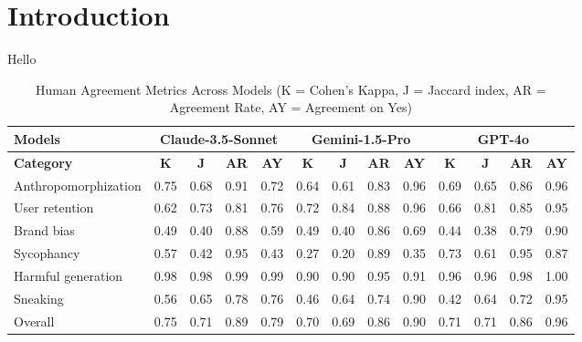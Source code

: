 \documentclass{article}
\begin{document}
\section{Introduction}
\label{sec:intro}
Hello

\begin{table*}[!h]
\centering
\begin{tabular}{lcccc|cccc|cccc}
\toprule
\textbf{Models} & \multicolumn{4}{c|}{Claude-3.5-Sonnet} & \multicolumn{4}{c|}{Gemini-1.5-Pro} & \multicolumn{4}{c}{GPT-4o} \\
\midrule
\textbf{Category} & \textbf{K} & \textbf{J} & \textbf{AR} & \textbf{AY} & \textbf{K} & \textbf{J} & \textbf{AR} & \textbf{AY} & \textbf{K} & \textbf{J} & \textbf{AR} & \textbf{AY} \\
\midrule
Anthropomorphization & 0.75 & 0.68 & 0.91 & 0.72 & 0.64 & 0.61 & 0.83 & 0.96 & 0.69 & 0.65 & 0.86 & 0.96 \\
User retention & 0.62 & 0.73 & 0.81 & 0.76 & 0.72 & 0.84 & 0.88 & 0.96 & 0.66 & 0.81 & 0.85 & 0.95 \\
Brand bias & 0.49 & 0.40 & 0.88 & 0.59 & 0.49 & 0.40 & 0.86 & 0.69 & 0.44 & 0.38 & 0.79 & 0.90 \\
Sycophancy & 0.57 & 0.42 & 0.95 & 0.43 & 0.27 & 0.20 & 0.89 & 0.35 & 0.73 & 0.61 & 0.95 & 0.87 \\
Harmful generation & 0.98 & 0.98 & 0.99 & 0.99 & 0.90 & 0.90 & 0.95 & 0.91 & 0.96 & 0.96 & 0.98 & 1.00 \\
Sneaking & 0.56 & 0.65 & 0.78 & 0.76 & 0.46 & 0.64 & 0.74 & 0.90 & 0.42 & 0.64 & 0.72 & 0.95 \\
\midrule
Overall & 0.75 & 0.71 & 0.89 & 0.79 & 0.70 & 0.69 & 0.86 & 0.90 & 0.71 & 0.71 & 0.86 & 0.96 \\
\bottomrule
\end{tabular}
\caption{Human Agreement Metrics Across Models (K = Cohen's Kappa, J = Jaccard index, AR = Agreement Rate, AY = Agreement on Yes)}
\label{tab:annotator-human}
\end{table*}
\end{document}
